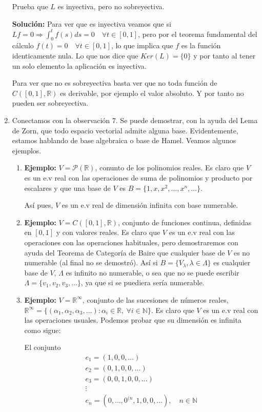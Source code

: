 \documentclass{article}
\begin{document}
\begin{enumerate}
Prueba que $L$ es inyectiva, pero no sobreyectiva.

\textbf{Solución:} Para ver que es inyectiva veamos que si $Lf=0\Rightarrow \int_0^t f(s)ds=0\quad \forall t\in[0,1]$, pero por el teorema fundamental del cálculo $f(t)=0\quad \forall t\in [0,1]$, lo que implica que $f$ es la función identicamente nula. Lo que nos dice que $Ker(L)=\{0\}$ y por tanto al tener un solo elemento la aplicación es inyectiva.

Para ver que no es sobreyectiva basta ver que no toda función de $C([0,1],\mathbb{R})$ es derivable, por ejemplo el valor absoluto. Y por tanto no pueden ser sobreyectiva.

\item Conectamos con la observación 7. Se puede demostrar, con la ayuda del Lema de Zorn, que todo espacio vectorial admite alguna base. Evidentemente, estamos hablando de base algebraica o base de Hamel. Veamos algunos ejemplos.

	\begin{enumerate}
	\item \textbf{Ejemplo:} $V=\mathcal{P}(\mathbb{R})$, conunto de los polinomios reales. Es claro que $V$ es un e.v real con las operaciones de suma de polinomios y producto por escalares y que una base de $V$ es $B=\{1,x,x^2,\ldots,x^n,\ldots\}$.
	
	Así pues, $V$ es un e.v real de dimensión infinita con base numerable.
	
	\item \textbf{Ejemplo:} $V=C([0,1],\mathbb{R})$, conjunto de funciones continua, definidas en $[0,1]$ y con valores reales. Es claro que $V$ es un e.v real con las operaciones con las operaciones habituales, pero demostraremos con ayuda del Teorema de Categoría de Baire que cualquier base de $V$ es no numerable (al final no se demostró). Así si $B=\{V_\lambda, \lambda\in \Lambda\}$ es cualquier base de $V$, $\Lambda$ es infinito no numerable, o sea que no se puede escribir $\Lambda=\{v_1,v_2,v_3,\ldots\}$, ya que si se puediera sería numerable.
	
	\item \textbf{Ejemplo:} $V=\mathbb{R}^\infty$, conjunto de las sucesiones de números reales, $\mathbb{R}^\infty =\{(\alpha_1,\alpha_2,\alpha_3,\ldots):\alpha_i\in \mathbb{R},\:\forall i\in \mathbb{N}\}$. Es claro que $V$ es un e.v real con las operaciones usuales. Podemos probar que su dimensión es infinita como sigue:
	
	El conjunto
	\begin{gather*}
	e_1=(1,0,0,\ldots)\\
	e_2=(0,1,0,0,\ldots)\\
	e_3=(0,0,1,0,0,\ldots)\\
	\vdots\\
	e_n=(0,\ldots,0^{(n},1,0,0,\ldots),\quad n\in\mathbb{N}
	\end{gather*}
	

\end{enumerate}
\end{enumerate}
\end{document}
